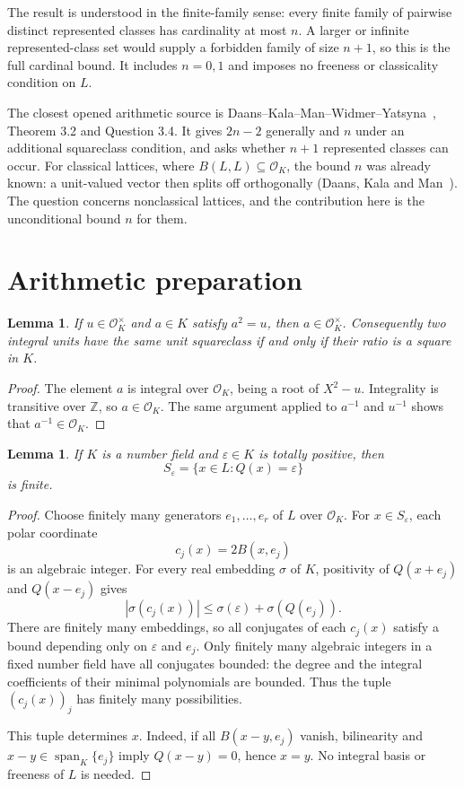 \documentclass[11pt]{article}
\newtheorem{lemma}[theorem]{Lemma}
\newcommand{\OK}{\mathcal O_K}
\newcommand{\Z}{\mathbb Z}
\begin{document}
The result is understood in the finite-family sense: every finite family of pairwise distinct represented classes has cardinality at most $n$. A larger or infinite represented-class set would supply a forbidden family of size $n+1$, so this is the full cardinal bound. It includes $n=0,1$ and imposes no freeness or classicality condition on $L$.

The closest opened arithmetic source is Daans--Kala--Man--Widmer--Yatsyna~\cite{DKMWY}, Theorem 3.2 and Question 3.4. It gives $2n-2$ generally and $n$ under an additional squareclass condition, and asks whether $n+1$ represented classes can occur. For classical lattices, where $B(L,L)\subseteq\OK$, the bound $n$ was already known: a unit-valued vector then splits off orthogonally (Daans, Kala and Man~\cite[Propositions~4.1--4.2]{DKM}). The question concerns nonclassical lattices, and the contribution here is the unconditional bound $n$ for them.

\section{Arithmetic preparation}
\begin{lemma}\label{lem:unit}
If $u\in\OK^\times$ and $a\in K$ satisfy $a^2=u$, then $a\in\OK^\times$. Consequently two integral units have the same unit squareclass if and only if their ratio is a square in $K$.
\end{lemma}
\begin{proof}
The element $a$ is integral over $\OK$, being a root of $X^2-u$. Integrality is transitive over $\Z$, so $a\in\OK$. The same argument applied to $a^{-1}$ and $u^{-1}$ shows that $a^{-1}\in\OK$.
\end{proof}

\begin{lemma}\label{lem:shell}
If $K$ is a number field and $\varepsilon\in K$ is totally positive, then
\[
 S_\varepsilon=\{x\in L:Q(x)=\varepsilon\}
\]
is finite.
\end{lemma}
\begin{proof}
Choose finitely many generators $e_1,\ldots,e_r$ of $L$ over $\OK$. For $x\in S_\varepsilon$, each polar coordinate
\[
 c_j(x)=2B(x,e_j)
\]
is an algebraic integer. For every real embedding $\sigma$ of $K$, positivity of $Q(x+e_j)$ and $Q(x-e_j)$ gives
\[
 |\sigma(c_j(x))|\leq \sigma(\varepsilon)+\sigma(Q(e_j)).
\]
There are finitely many embeddings, so all conjugates of each $c_j(x)$ satisfy a bound depending only on $\varepsilon$ and $e_j$. Only finitely many algebraic integers in a fixed number field have all conjugates bounded: the degree and the integral coefficients of their minimal polynomials are bounded. Thus the tuple $(c_j(x))_j$ has finitely many possibilities.

This tuple determines $x$. Indeed, if all $B(x-y,e_j)$ vanish, bilinearity and $x-y\in\operatorname{span}_K\{e_j\}$ imply $Q(x-y)=0$, hence $x=y$. No integral basis or freeness of $L$ is needed.
\end{proof}
\end{document}

